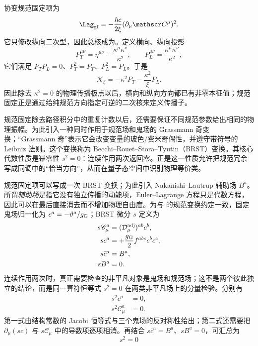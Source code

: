 \begin{exbox}[自由 $U(1)$ 场中的规范零模]
协变规范固定项为
\begin{equation*}
 \Lag_{\rm gf}
 =-\frac{\hbar c}{2\xi}(\partial_\mu\mathscr C^\mu)^2.
\end{equation*}
它只修改纵向二次型，因此总核成为。定义横向、纵向投影
\begin{equation*}
 P_T^{\mu\nu}=\eta^{\mu\nu}-\frac{\kappa^\mu\kappa^\nu}{\kappa^2},
 \qquad
 P_L^{\mu\nu}=\frac{\kappa^\mu\kappa^\nu}{\kappa^2},
\end{equation*}
它们满足 $P_TP_L=0$、$P_T^2=P_T$、$P_L^2=P_L$。于是
\begin{equation*}
 \mathcal K_\xi
 =-\kappa^2 P_T-\frac{\kappa^2}{\xi}P_L.
\end{equation*}
因此除去 $\kappa^2=0$ 的物理传播极点以后，横向和纵向方向都已有非零本征值；规范固定正是通过给纯规范方向指定可逆的二次核来定义传播子。
\end{exbox}

规范固定除去路径积分中的重复计数以后，还需要保证不同规范参数给出相同的物理振幅。为此引入一种同时作用于规范场和鬼场的 Grassmann 奇变换；“Grassmann 奇”表示它会改变变量的玻色/费米奇偶性，并遵守带符号的 Leibniz 法则。这个变换称为 Becchi--Rouet--Stora--Tyutin（BRST）变换。其核心代数性质是幂零性 $s^2=0$：连续作用两次返回零。正是这一性质允许把规范冗余写成同调中的“恰当方向”，从而在量子态空间中识别物理等价类。

规范固定项可以写成一次 BRST 变换；为此引入 Nakanishi--Lautrup 辅助场 $B^a$。所谓\emph{辅助场}是指它没有独立传播的动能项，Euler--Lagrange 方程只是代数方程，因此可以在最后直接消去而不增加物理自由度。为与 的规范变换约定一致，固定鬼场归一化为 $c^a=-\vartheta^a/g_{\rm G}$；BRST 微分 $s$ 定义为
\begin{align}
 s\mathscr C_\mu^a
 &=(\mathcal D_\mu^{\rm adj})^{ab}c^b,\\
 sc^a
 &=+\frac {g_{\rm G}}2 f^{abc}c^bc^c,\\
 s\bar c^a
 &=B^a,\\
 sB^a&=0.
 \label{eq:brst-transform-general-dp11}
\end{align}
连续作用两次时，真正需要检查的非平凡对象是鬼场和规范场；这不是两个彼此独立的结论，而是同一算符恒等式 $s^2=0$ 在两类非平凡场上的分量检验。分别有
\begin{align}
 s^2c^a&=0,
 \label{eq:brst-ghost-nilpotent-dp68}\\
 s^2\mathscr C_\mu^a&=0.
 \label{eq:brst-gauge-nilpotent-dp68}
\end{align}
第一式由结构常数的 Jacobi 恒等式与三个鬼场的反对称性给出；第二式还需要把 $\partial_\mu(sc)$ 与 $s\mathscr C_\mu$ 中的导数项逐项相消。再结合 $s\bar c^a=B^a$、$sB^a=0$，可汇总为
\begin{equation}
 \boxed{s^2=0}
 \label{eq:brst-nilpotent-dp11}
\end{equation}

